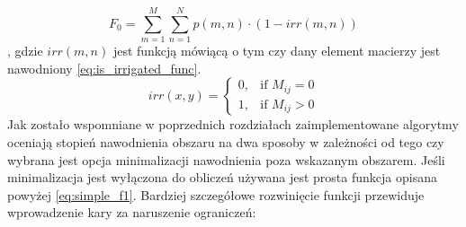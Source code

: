 \documentclass[twoside]{iisthesis}
\begin{document}
\begin{equation}\label{eq:simple_f1}
	F_{0} = \sum_{m=1}^{M}\sum_{n=1}^{N} p(m,n) \cdot (1 - irr(m,n))
\end{equation}
, gdzie $irr(m,n)$ jest funkcją mówiącą o tym czy dany element macierzy jest nawodniony \eqref{eq:is_irrigated_func}.
\begin{equation}\label{eq:is_irrigated_func}
	irr(x,y) = \begin{cases}
				0,& \text{if } M_{ij} = 0 \\
				1,& \text{if } M_{ij} > 0
			   \end{cases}
\end{equation}
Jak zostało wspomniane w poprzednich rozdziałach zaimplementowane algorytmy oceniają stopień nawodnienia obszaru na dwa sposoby w zależności od tego czy wybrana jest opcja minimalizacji nawodnienia poza wskazanym obszarem. Jeśli minimalizacja jest wyłączona do obliczeń używana jest prosta funkcja opisana powyżej \eqref{eq:simple_f1}. Bardziej szczegółowe rozwinięcie funkcji przewiduje wprowadzenie kary za naruszenie ograniczeń:
\end{document}
